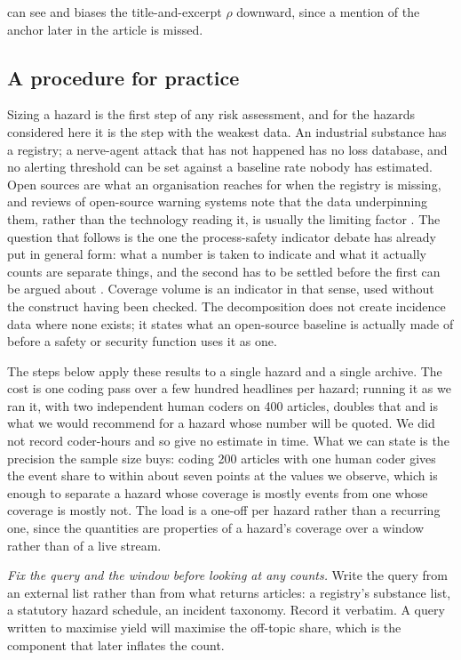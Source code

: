 \documentclass[1p,times]{elsarticle}
\begin{document}
can see and biases the title-and-excerpt $\rho$ downward, since a mention of the anchor later in the article is missed.

\subsection{A procedure for practice}
\label{sec:practice}
Sizing a hazard is the first step of any risk assessment, and for the hazards considered here it is the step with the weakest data. An industrial substance has a registry; a nerve-agent attack that has not happened has no loss database, and no alerting threshold can be set against a baseline rate nobody has estimated. Open sources are what an organisation reaches for when the registry is missing, and reviews of open-source warning systems note that the data underpinning them, rather than the technology reading it, is usually the limiting factor \cite{rokhideh2025mhews}. The question that follows is the one the process-safety indicator debate has already put in general form: what a number is taken to indicate and what it actually counts are separate things, and the second has to be settled before the first can be argued about \cite{hopkins2009indicators,ale2009indicators}. Coverage volume is an indicator in that sense, used without the construct having been checked. The decomposition does not create incidence data where none exists; it states what an open-source baseline is actually made of before a safety or security function uses it as one.

The steps below apply these results to a single hazard and a single archive. The cost is one coding pass over a few hundred headlines per hazard; running it as we ran it, with two independent human coders on 400 articles, doubles that and is what we would recommend for a hazard whose number will be quoted. We did not record coder-hours and so give no estimate in time. What we can state is the precision the sample size buys: coding 200 articles with one human coder gives the event share to within about seven points at the values we observe, which is enough to separate a hazard whose coverage is mostly events from one whose coverage is mostly not. The load is a one-off per hazard rather than a recurring one, since the quantities are properties of a hazard's coverage over a window rather than of a live stream.

\emph{Fix the query and the window before looking at any counts.} Write the query from an external list rather than from what returns articles: a registry's substance list, a statutory hazard schedule, an incident taxonomy. Record it verbatim. A query written to maximise yield will maximise the off-topic share, which is the component that later inflates the count.
\end{document}
